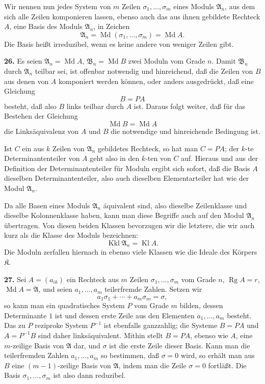 \documentclass[11pt,a4paper]{article}
\newcommand{\K}{\mathfrak K}
\newcommand{\Kl}{\operatorname{Kl}}
\newcommand{\Kkl}{\operatorname{Kkl}}
\begin{document}
Wir nennen nun jedes System von \(m\) Zeilen \(\sigma_1,\ldots,\sigma_m\) eines Moduls \(\mathfrak A_n\), aus dem sich alle Zeilen komponieren lassen, ebenso auch das aus ihnen gebildete Rechteck \(A\), eine Basis des Moduls \(\mathfrak A_n\), in Zeichen
\[
 \mathfrak A_n=\operatorname{Md}(\sigma_1,\ldots,\sigma_m)=\operatorname{Md} A.
\]
Die Basis heißt irreduzibel, wenn es keine andere von weniger Zeilen gibt.

\textbf{26.} Es seien \(\mathfrak A_n=\operatorname{Md}A\), \(\mathfrak B_n=\operatorname{Md}B\) zwei Moduln vom Grade \(n\). Damit \(\mathfrak B_n\) durch \(\mathfrak A_n\) teilbar sei, ist offenbar notwendig und hinreichend, daß die Zeilen von \(B\) aus denen von \(A\) komponiert werden können, oder anders ausgedrückt, daß eine Gleichung
\[
 B=PA
\]
besteht, daß also \(B\) links teilbar durch \(A\) ist. Daraus folgt weiter, daß für das Bestehen der Gleichung
\[
 \operatorname{Md}B=\operatorname{Md}A
\]
die Linksäquivalenz von \(A\) und \(B\) die notwendige und hinreichende Bedingung ist.

Ist \(C\) ein aus \(k\) Zeilen von \(\mathfrak A_n\) gebildetes Rechteck, so hat man \(C=PA\); der \(k\)-te Determinantenteiler von \(A\) geht also in den \(k\)-ten von \(C\) auf. Hieraus und aus der Definition der Determinantenteiler für Moduln ergibt sich sofort, daß die Basis \(A\) dieselben Determinantenteiler, also auch dieselben Elementarteiler hat wie der Modul \(\mathfrak A_n\).

Da alle Basen eines Moduls \(\mathfrak A_n\) äquivalent sind, also dieselbe Zeilenklasse und dieselbe Kolonnenklasse haben, kann man diese Begriffe auch auf den Modul \(\mathfrak A_n\) übertragen. Von diesen beiden Klassen bevorzugen wir die letztere, die wir auch kurz als die Klasse des Moduls bezeichnen:
\[
 \Kkl \mathfrak A_n=\Kl A.
\]
Die Moduln zerfallen hiernach in ebenso viele Klassen wie die Ideale des Körpers \(\K\).

\textbf{27.} Sei \(A=(a_{ik})\) ein Rechteck aus \(m\) Zeilen \(\sigma_1,\ldots,\sigma_m\) vom Grade \(n\), \(\operatorname{Rg}A=r\), \(\operatorname{Md}A=\mathfrak A\), und seien \(a_1,\ldots,a_m\) teilerfremde Zahlen. Setzen wir
\[
 a_1\sigma_1+\cdots+a_m\sigma_m=\sigma, \tag{28}
\]
so kann man ein quadratisches System \(P\) vom Grade \(m\) bilden, dessen Determinante \(1\) ist und dessen erste Zeile aus den Elementen \(a_1,\ldots,a_m\) besteht. Das zu \(P\) reziproke System \(P^{-1}\) ist ebenfalls ganzzahlig; die Systeme \(B=PA\) und \(A=P^{-1}B\) sind daher linksäquivalent. Mithin stellt \(B=PA\), ebenso wie \(A\), eine \(m\)-zeilige Basis von \(\mathfrak A\) dar, und \(\sigma\) ist die erste Zeile dieser Basis. Kann man die teilerfremden Zahlen \(a_1,\ldots,a_m\) so bestimmen, daß \(\sigma=0\) wird, so erhält man aus \(B\) eine \((m-1)\)-zeilige Basis von \(\mathfrak A\), indem man die Zeile \(\sigma=0\) fortläßt. Die Basis \(\sigma_1,\ldots,\sigma_m\) ist also dann reduzibel.
\end{document}
